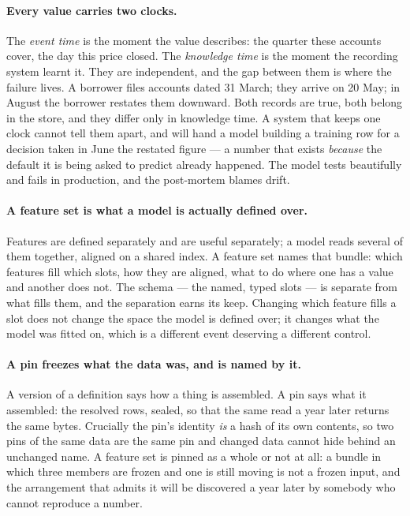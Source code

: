 \documentclass[11pt,a4paper]{article}
\renewcommand{\_}{\oldunderscore\allowbreak}
\theoremstyle{plain}
\theoremstyle{definition}
\theoremstyle{definition}
\theoremstyle{remark}
\begin{document}
\paragraph{Every value carries two clocks.} The \emph{event time} is the moment the value describes: the
quarter these accounts cover, the day this price closed. The \emph{knowledge time} is the moment the
recording system learnt it. They are independent, and the gap between them is where the failure lives.
A borrower files accounts dated 31 March; they arrive on 20 May; in August the borrower restates them
downward. Both records are true, both belong in the store, and they differ only in knowledge time. A
system that keeps one clock cannot tell them apart, and will hand a model building a training row for a
decision taken in June the restated figure --- a number that exists \emph{because} the default it is
being asked to predict already happened. The model tests beautifully and fails in production, and the
post-mortem blames drift.

\paragraph{A feature set is what a model is actually defined over.} Features are defined separately and
are useful separately; a model reads several of them together, aligned on a shared index. A feature set
names that bundle: which features fill which slots, how they are aligned, what to do where one has a
value and another does not. The schema --- the named, typed slots --- is separate from what fills them,
and the separation earns its keep. Changing which feature fills a slot does not change the space the
model is defined over; it changes what the model was fitted on, which is a different event deserving a
different control.

\paragraph{A pin freezes what the data was, and is named by it.} A version of a definition says how a
thing is assembled. A pin says what it assembled: the resolved rows, sealed, so that the same read a
year later returns the same bytes. Crucially the pin's identity \emph{is} a hash of its own contents, so
two pins of the same data are the same pin and changed data cannot hide behind an unchanged name. A
feature set is pinned as a whole or not at all: a bundle in which three members are frozen and one is
still moving is not a frozen input, and the arrangement that admits it will be discovered a year later
by somebody who cannot reproduce a number.
\end{document}
